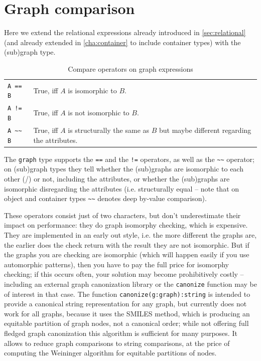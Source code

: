 \section{Graph comparison}\label{sec:relationalgraph}

Here we extend the relational expressions already introduced in \ref{sec:relational} (and already extended in \ref{cha:container} to include container types) with the (sub)graph type.

\begin{table}[htbp]
  \centering
  \begin{tabularx}{\linewidth}{|l|X|} \hline
    \texttt{A == B} & True, iff $A$ is isomorphic to $B$. \\
    \texttt{A != B} & True, iff $A$ is not isomorphic to $B$. \\
    \texttt{A \textasciitilde\textasciitilde{} B} & True, iff $A$ is structurally the same as $B$ but maybe different regarding the attributes. \\ \hline
  \end{tabularx}
  \caption{Compare operators on graph expressions}
  \label{compandgraph}
\end{table}

The \texttt{graph} type supports the \texttt{==} and the \texttt{!=} operators, as well as the \texttt{\textasciitilde\textasciitilde} operator;
on (sub)graph types they tell whether the (sub)graphs are isomorphic to each other (/) or not, including the attributes, or whether the (sub)graphs are isomorphic disregarding the attributes (i.e. structurally equal -- note that on object and container types \texttt{\textasciitilde\textasciitilde} denotes deep by-value comparison).

These operators consist just of two characters, but don't underestimate their impact on performance:
they do graph isomorphy checking, which is expensive.
They are implemented in an early out style, i.e. the more different the graphs are, the earlier does the check return with the result they are not isomorphic.
But if the graphs you are checking are isomorphic (which will happen easily if you use automorphic patterns), then you have to pay the full price for isomorphy checking; if this occurs often, your solution may become prohibitively costly -- including an external graph canonization library or the \texttt{canonize} function may be of interest in that case.
The function \texttt{canonize(g:graph):string} is intended to provide a canonical string representation for any graph, but currently does not work for all graphs, because it uses the SMILES\cite{SMILES} method, which is producing an equitable partition of graph nodes, not a canonical order; while not offering full fledged graph canonization this algorithm is sufficient for many purposes.
It allows to reduce graph comparisons to string comparisons, at the price of computing the Weininger algorithm for equitable partitions of nodes.

